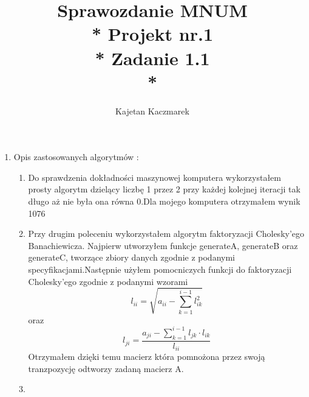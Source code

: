 \documentclass[a4paper, 11pt]{article}
\author{Kajetan Kaczmarek}
\begin{document}
\title{Sprawozdanie MNUM \\* Projekt nr.1 \\* 
Zadanie 1.1 \\*}
\maketitle

\begin{enumerate}

\item Opis zastosowanych algorytmów : 
\begin{enumerate}
\item Do sprawdzenia dokładności maszynowej komputera wykorzystałem prosty algorytm dzielący liczbę 1 przez 2 przy każdej kolejnej iteracji tak długo aż nie była ona równa 0.Dla mojego komputera otrzymałem wynik 1076
\item Przy drugim poleceniu wykorzystałem algorytm faktoryzacji Cholesky'ego Banachiewicza. Najpierw utworzyłem funkcje generateA, generateB oraz generateC, tworzące zbiory danych zgodnie z podanymi specyfikacjami.Następnie użyłem pomocniczych funkcji do faktoryzacji
 Cholesky'ego zgodnie z podanymi wzorami 
 \[ l_{ii} = \sqrt{a_{ii} - \sum_{ k = 1 }^{i-1}l^2_{ik} }  \]
  oraz 
 \[ l_{ji} =
  \dfrac
 { a_{ji} - \sum_{k=1}^{i-1}
  l_{jk} \cdot l_{ik}}{l_{ii} } \]
  Otrzymałem dzięki temu macierz która pomnożona przez swoją tranzpozycję odtworzy zadaną macierz A.
\item
\end{enumerate}
\end{enumerate}
\end{document}

